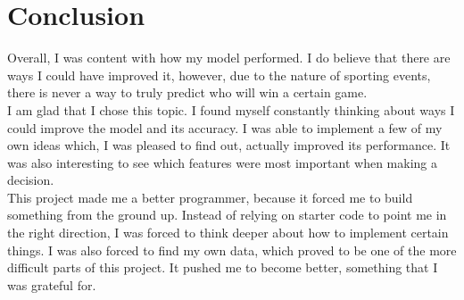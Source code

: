 \documentclass[10pt]{article}
\begin{document}
\section{Conclusion}
    Overall, I was content with how my model performed.  I do believe that there are ways I could have improved it, however, due to the nature of sporting events, there is never a way to truly predict who will win a certain game.\\
    I am glad that I chose this topic.  I found myself constantly thinking about ways I could improve the model and its accuracy.  I was able to implement a few of my own ideas which, I was pleased to find out, actually improved its performance.  It was also interesting to see which features were most important when making a decision.\\
    This project made me a better programmer, because it forced me to build something from the ground up.  Instead of relying on starter code to point me in the right direction, I was forced to think deeper about how to implement certain things.  I was also forced to find my own data, which proved to be one of the more difficult parts of this project.  It pushed me to become better, something that I was grateful for.
\end{document}
